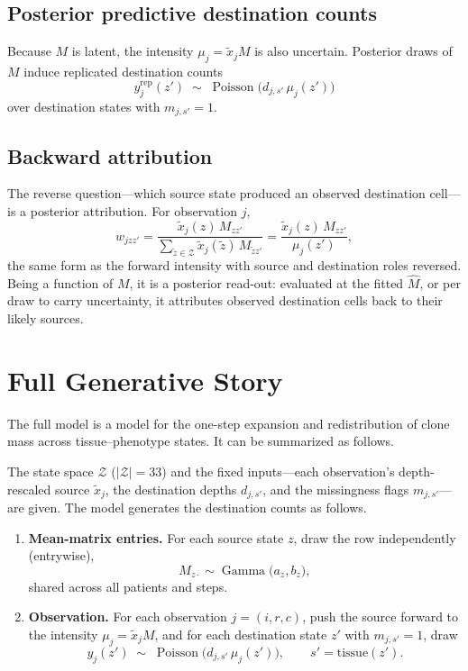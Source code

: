 \documentclass[11pt]{article}
\newcommand{\Zsp}{\mathcal{Z}}                    %
\DeclareMathOperator{\Pois}{Poisson}
\DeclareMathOperator{\Gam}{Gamma}
\theoremstyle{definition}
\begin{document}
\subsection{Posterior predictive destination counts}

Because $M$ is latent, the intensity $\mu_j = \tilde{x}_j M$ is also uncertain.
Posterior draws of $M$ induce replicated destination counts
\[
  y_j^{\mathrm{rep}}(z') \;\sim\; \Pois\!\bigl( d_{j,s'}\, \mu_j(z') \bigr)
\]
over destination states with $m_{j,s'} = 1$.

\subsection{Backward attribution}
\label{sec:backward}

The reverse question---which source state produced an observed destination
cell---is a posterior attribution. For observation $j$,
\[
  w_{jzz'}
  =
  \frac{\tilde{x}_j(z)\, M_{zz'}}
       {\sum_{\tilde z\in\Zsp} \tilde{x}_j(\tilde z)\, M_{\tilde z z'}}
  =
  \frac{\tilde{x}_j(z)\, M_{zz'}}{\mu_j(z')} ,
\]
the same form as the forward intensity with source and destination roles
reversed. Being a function of $M$, it is a posterior read-out: evaluated at the
fitted $\widehat{M}$, or per draw to carry uncertainty, it attributes observed
destination cells back to their likely sources.

\section{Full Generative Story}
\label{sec:generative}

The full model is a model for the one-step expansion and redistribution of clone
mass across tissue--phenotype states. It can be summarized as follows.

\begin{keybox}[title={Generative model}]
The state space $\Zsp$ ($|\Zsp| = 33$) and the fixed inputs---each observation's
depth-rescaled source $\tilde{x}_j$, the destination depths $d_{j,s'}$, and the
missingness flags $m_{j,s'}$---are given. The model generates the destination
counts as follows.
\begin{enumerate}[leftmargin=2em, itemsep=4pt]
  \item \textbf{Mean-matrix entries.} For each source state $z$, draw the row
        independently (entrywise),
        \[
          M_{z\cdot} \sim \Gam\!\bigl( a_z, b_z \bigr),
        \]
        shared across all patients and steps.

  \item \textbf{Observation.} For each observation $j = (i,r,c)$, push the source
        forward to the intensity $\mu_j = \tilde{x}_j M$, and for each destination
        state $z'$ with $m_{j,s'} = 1$, draw
        \[
          y_j(z') \;\sim\; \Pois\!\bigl( d_{j,s'}\, \mu_j(z') \bigr),
          \qquad s' = \mathrm{tissue}(z') .
        \]
\end{enumerate}
\end{keybox}
\end{document}
